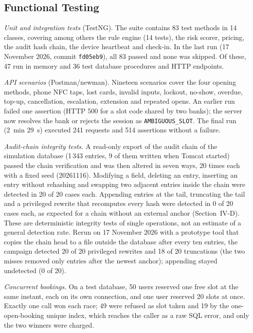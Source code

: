 \documentclass[journal,onecolumn]{IEEEtran}
\newcommand{\revisioncommit}{fd05eb9}
\begin{document}
\subsection{Functional Testing}
\label{sec:functional}

\textit{Unit and integration tests} (TestNG). The suite contains 83 test methods in 14 classes, covering among others the
rule engine (14 tests), the risk scorer, pricing, the audit hash chain, the device heartbeat and check-in. In the last run (17 November 2026, commit
\texttt{\revisioncommit}), all 83 passed and none was skipped. Of these, 47 run in memory and 36
test database procedures and HTTP endpoints.

\textit{API scenarios} (Postman/newman). Nineteen scenarios cover the four opening methods, phone NFC taps, lost
cards, invalid inputs, lockout, no-show, overdue, top-up, cancellation, escalation, extension and repeated opens. An
earlier run failed one assertion (HTTP 500 for a slot code shared by two banks); the server now resolves the bank or
rejects the session as \texttt{AMBIGUOUS\_SLOT}. The final run (2~min 29~s) executed 241 requests and 514 assertions
without a failure.

\textit{Audit-chain integrity tests.} A read-only export of the audit chain of the simulation database (1\,343
entries, 9 of them written when Tomcat started) passed the chain verification and was then altered in seven ways, 20
times each with a fixed seed (20261116). Modifying a field, deleting an entry, inserting an entry without rehashing
and swapping two adjacent entries inside the chain were detected in 20 of 20 cases each. Appending entries at the
tail, truncating the tail and a privileged rewrite that recomputes every hash were detected in 0 of 20 cases each, as
expected for a chain without an external anchor (Section~IV-D). These are deterministic integrity tests of single
operations, not an estimate of a general detection rate. Rerun on 17 November 2026 with a prototype tool that copies the
chain head to a file outside the database after every ten entries, the campaign detected 20 of 20 privileged rewrites and 18 of 20
truncations (the two misses removed only entries after the newest anchor); appending stayed undetected (0 of 20).

\textit{Concurrent bookings.} On a test database, 50 users reserved one free slot at the same instant, each on its own
connection, and one user reserved 20 slots at once. Exactly one call won each race; 49 were refused as slot taken and
19 by the one-open-booking unique index, which reaches the caller as a raw SQL error, and only the two winners were
charged.
\end{document}
